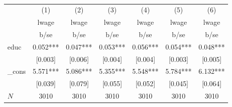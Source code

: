 \begin{table}[htbp]\centering
\def\sym#1{\ifmmode^{#1}\else\(^{#1}\)\fi}
\caption{ }
\begin{tabular}{l*{6}{c}}
\hline\hline
            &\multicolumn{1}{c}{(1)}&\multicolumn{1}{c}{(2)}&\multicolumn{1}{c}{(3)}&\multicolumn{1}{c}{(4)}&\multicolumn{1}{c}{(5)}&\multicolumn{1}{c}{(6)}\\
            &\multicolumn{1}{c}{lwage}&\multicolumn{1}{c}{lwage}&\multicolumn{1}{c}{lwage}&\multicolumn{1}{c}{lwage}&\multicolumn{1}{c}{lwage}&\multicolumn{1}{c}{lwage}\\
            &        b/se   &        b/se   &        b/se   &        b/se   &        b/se   &        b/se   \\
\hline
educ        &       0.052***&       0.047***&       0.053***&       0.056***&       0.054***&       0.048***\\
            &     [0.003]   &     [0.006]   &     [0.004]   &     [0.004]   &     [0.003]   &     [0.005]   \\
\_cons      &       5.571***&       5.086***&       5.355***&       5.548***&       5.784***&       6.132***\\
            &     [0.039]   &     [0.079]   &     [0.055]   &     [0.052]   &     [0.045]   &     [0.064]   \\
\hline
\(N\)       &        3010   &        3010   &        3010   &        3010   &        3010   &        3010   \\
\hline\hline
\end{tabular}
\end{table}
